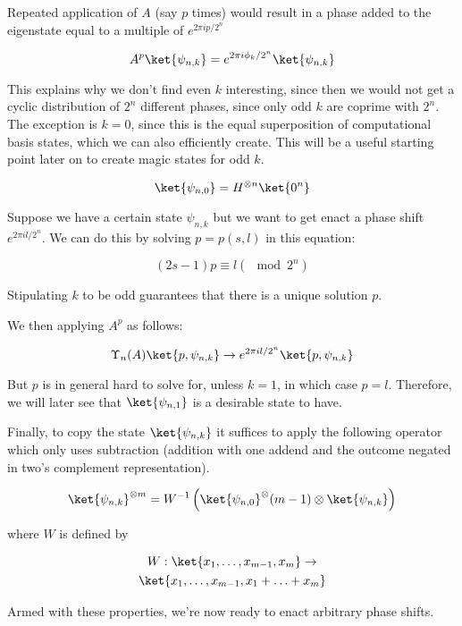 Repeated application of $A$ (say $p$ times) would result in a phase
added to the eigenstate equal to a multiple of $e^{2\pi i p / 2^n}$

\begin{equation}
A^p\ket{\psi_{n,k}} = e^{2\pi i \phi_k / 2^n} \ket{\psi_{n,k}}
\end{equation}

This explains why we don't find even $k$ interesting,
since then we would not get a
cyclic distribution of $2^n$ different phases,
since only odd $k$
are coprime with $2^n$. The exception is $k=0$, since this is the
equal superposition of computational basis states, which we can also
efficiently create. This will be a useful starting point later on to
create magic states
for odd $k$.

\begin{displaymath}
\ket{\psi_{n,0}} = H^{\otimes n}\ket{0^n}
\end{displaymath}

Suppose we have a certain state $\psi_{n,k}$ but we want to get enact
a phase shift $e^{2\pi i l / 2^n}$. We can do this by solving $p=p(s,l)$
in this equation:

\begin{equation}
\label{eqn:psl}
(2s-1)p \equiv l (\mod 2^n)
\end{equation}

Stipulating $k$ to be odd guarantees that there is a unique solution $p$.

We then applying $A^p$ as follows:

\begin{equation}
\label{eqn:upsilon}
\Upsilon_n(A) \ket{p, \psi_{n,k}} \rightarrow
e^{2\pi i l/2^n} \ket{p, \psi_{n,k}}
\end{equation}

But $p$ is in general hard to solve for, unless $k=1$, in which case
$p = l$. Therefore, we will later see that $\ket{\psi_{n,1}}$ is a desirable
state to have.

Finally, to copy the state $\ket{\psi_{n,k}}$ it suffices to apply the following
operator which only uses subtraction (addition with one addend and the
outcome negated in two's complement representation).

\begin{equation*}
\ket{\psi_{n,k}}^{\otimes m} = W^{-1}\left( \ket{\psi_{n,0}}^\otimes(m-1) \otimes \ket{\psi_{n,k}} \right)
\end{equation*}

where $W$ is defined by

\begin{multline}
W : \ket{x_1,\ldots,x_{m-1},x_m} \rightarrow \\
 \ket{x_1,\ldots,x_{m-1},x_1+\ldots+x_m}
\end{multline}

Armed with these properties, we're now ready to enact arbitrary phase shifts.